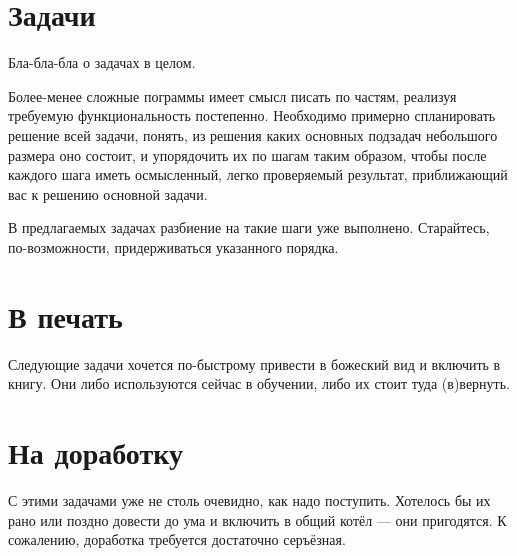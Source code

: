 \chapter{Задачи}

Бла-бла-бла о задачах в целом.

Более-менее сложные пограммы имеет смысл писать по частям, реализуя требуемую
функциональность постепенно. Необходимо примерно спланировать решение всей
задачи, понять, из решения каких основных подзадач небольшого размера оно
состоит, и упорядочить их по шагам таким образом, чтобы после каждого шага
иметь осмысленный, легко проверяемый результат, приближающий вас к решению
основной задачи.

В предлагаемых задачах разбиение на такие шаги уже выполнено. Старайтесь,
по-возможности, придерживаться указанного порядка.








\chapter{В печать}

Следующие задачи хочется по-быстрому привести в божеский вид и включить в
книгу. Они либо используются сейчас в обучении, либо их стоит туда (в)вернуть.












\chapter{На доработку}

С этими задачами уже не столь очевидно, как надо поступить. Хотелось бы их
рано или поздно довести до ума и включить в общий котёл --- они пригодятся.
К сожалению, доработка требуется достаточно серъёзная.

